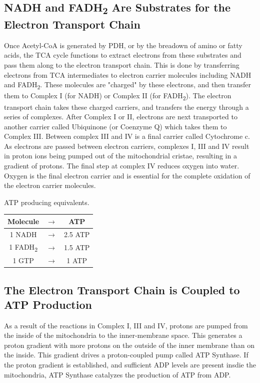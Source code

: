\documentclass{tufte-handout}
\begin{document}
\subsection{NADH and FADH\textsubscript{2} Are Substrates for the Electron Transport Chain}
Once Acetyl-CoA is generated by PDH, or by the breadown of amino or fatty acids, the TCA cycle functions to extract electrons from these substrates and pass them along to the electron transport chain.  This is done by transferring electrons from TCA intermediates to electron carrier molecules including NADH and FADH\textsubscript{2}.  These molecules are "charged" by these electrons, and then transfer them to Complex I (for NADH) or Complex II (for FADH\textsubscript{2}).  The electron transport chain takes these charged carriers, and transfers the energy through a series of complexes.  After Complex I or II, electrons are next transported to another carrier called Ubiquinone (or Coenzyme Q) which takes them to Complex III.  Between complex III and IV is a final carrier called Cytochrome c.  As electrons are passed between electron carriers, complexes I, III and IV result in proton ions being pumped out of the mitochondrial cristae, resulting in a gradient of protons.  The final step at complex IV reduces oxygen into water.  Oxygen is the final electron carrier and is essential for the complete oxidation of the electron carrier molecules.

\begin{margintable}
\centering
\caption{ATP producing equivalents.}
\label{tab:atp-equivalents}
\begin{tabular}{ccc}
\hline
\textbf {Molecule} & $\rightarrow$ & \textbf{ATP}\\
\hline
1 NADH & $\rightarrow$ & 2.5 ATP \\
1 FADH\textsubscript{2} & $\rightarrow$ &  1.5 ATP  \\
1 GTP & $\rightarrow$ &  1 ATP  \\
\hline
\end{tabular}
\end{margintable}

\subsection{The Electron Transport Chain is Coupled to ATP Production}

As a result of the reactions in Complex I, III and IV, protons are pumped from the inside of the mitochondria to the inner-membrane space.  This generates a proton gradient with more protons on the outside of the inner membrane than on the inside.  This gradient drives a proton-coupled pump called ATP Synthase.  If the proton gradient is established, and sufficient ADP levels are present insdie the mitochondria, ATP Synthase catalyzes the production of ATP from ADP.
\end{document}
